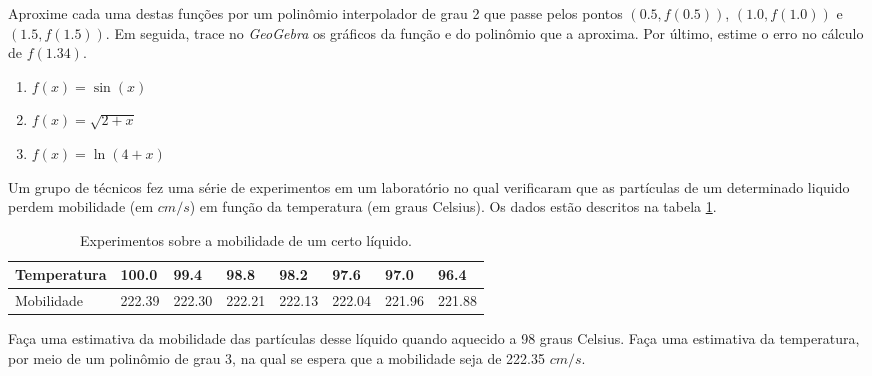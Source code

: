\begin{ex}
Aproxime cada uma destas funções por um polinômio interpolador de grau 2 que passe pelos pontos $(0.5 , f(0.5) )$, $(1.0 , f(1.0))$ e $(1.5, f(1.5))$. Em seguida, trace no \emph{GeoGebra} os gráficos da função e do polinômio que a aproxima. Por último, estime o erro no cálculo de $f(1.34)$.
\begin{enumerate}
\item $f(x)=\sin(x)$
\item $f(x)=\sqrt{2+x}$
\item $f(x)=\ln(4+x)$
\end{enumerate}
\end{ex}

\begin{ex}
Um grupo de técnicos fez uma série de experimentos em um laboratório no qual verificaram que as partículas de um determinado liquido perdem mobilidade (em $cm/s$) em função da temperatura (em graus Celsius). Os dados estão descritos na tabela \ref{quimica}.

\begin{table}[hbt]
\centering
\caption{Experimentos sobre a mobilidade de um certo líquido.}
\label{quimica}
\begin{tabular}{@{}llllllll@{}}
\toprule
Temperatura & 100.0  & 99.4   & 98.8   & 98.2   & 97.6   & 97.0   & 96.4   \\ \midrule
Mobilidade  & 222.39 & 222.30 & 222.21 & 222.13 & 222.04 & 221.96 & 221.88 \\ \bottomrule
\end{tabular}
\end{table}
Faça uma estimativa da mobilidade das partículas desse líquido quando aquecido a 98 graus Celsius. Faça uma estimativa da temperatura, por meio de um polinômio de grau 3, na qual se espera que a mobilidade seja de 222.35 $cm/s$.
\end{ex}





